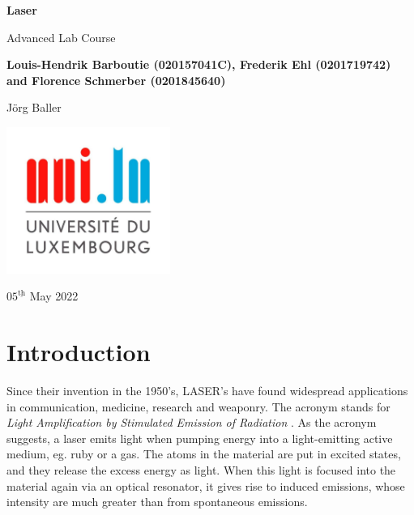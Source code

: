 \documentclass{scrartcl}
\begin{document}
\begin{titlepage}
    \begin{center}
        \vspace*{1cm}
        \Huge
        \textbf{Laser}
        
        \vspace{0.5cm}
        \LARGE
        Advanced Lab Course
        
        \vspace{1.5cm}
        \textbf{Louis-Hendrik Barboutie (020157041C), Frederik Ehl (0201719742) and Florence Schmerber (0201845640)}
        
        \vspace{1cm}
        Jörg Baller
        \vfill
        

        \includegraphics[width=0.4\textwidth]{logo_uni.jpg}
        
        \Large
        $05^{\underline{\text{th}}}$ May 2022
    \end{center}
\end{titlepage}

\section{Introduction}

Since their invention in the 1950's, LASER's have found widespread applications in communication, medicine, research and weaponry. The acronym stands for \textit{Light Amplification by Stimulated Emission of Radiation} \cite{laser}. As the acronym suggests, a laser emits light when pumping energy into a light-emitting active medium, eg. ruby or a gas. The atoms in the material are put in excited states, and they release the excess energy as light. When this light is focused into the material again via an optical resonator, it gives rise to induced emissions, whose intensity are much greater than from spontaneous emissions.
\end{document}
